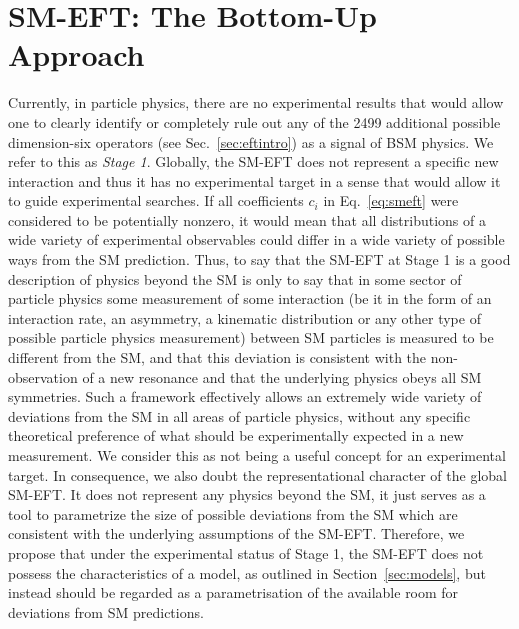 
\section{SM-EFT: The Bottom-Up Approach}
\label{sec:classification}

Currently, in particle physics, there are no experimental
results that would allow one to clearly identify or completely rule out any of the 2499 additional possible
dimension-six operators
(see
Sec.~\ref{sec:eftintro}) as a signal of 
BSM physics. We refer to this as \emph{Stage 1}.
Globally, the SM-EFT does not represent a specific new interaction
and thus it has no experimental target in a sense that would allow it to
guide experimental searches.  If all coefficients 
$c_i$ in Eq.~\ref{eq:smeft}
were considered to be potentially nonzero, it would mean that all
distributions of a wide variety of experimental observables could
differ in a wide variety of possible ways from the SM prediction.
Thus, to say that the SM-EFT at Stage 1 is a
good description of physics beyond the SM is only to say that in some
sector of particle physics some measurement of some interaction (be it
in the form of an interaction rate, an asymmetry, a kinematic
distribution or any other type of possible particle physics
measurement) between SM particles is measured to be different from
the SM, and that this deviation is consistent with the non-observation
of a new resonance and that the underlying physics obeys all SM
symmetries. 
Such a framework effectively allows an extremely wide variety
of deviations from the SM in all areas of particle physics, without
any specific theoretical preference of what should be experimentally
expected in a new measurement. We consider this as not being a
useful concept for an experimental target. In consequence, we also doubt the
representational character of the global SM-EFT. It does not represent any physics beyond the SM, it just serves as a tool to
parametrize the size of possible deviations from the SM which are
consistent with the underlying assumptions of the SM-EFT. Therefore,
we propose that under the experimental status of Stage 1, the SM-EFT does
not possess the characteristics of a model, as outlined in
Section~\ref{sec:models}, but instead should be regarded as a
parametrisation of the available room for deviations from SM
predictions.

